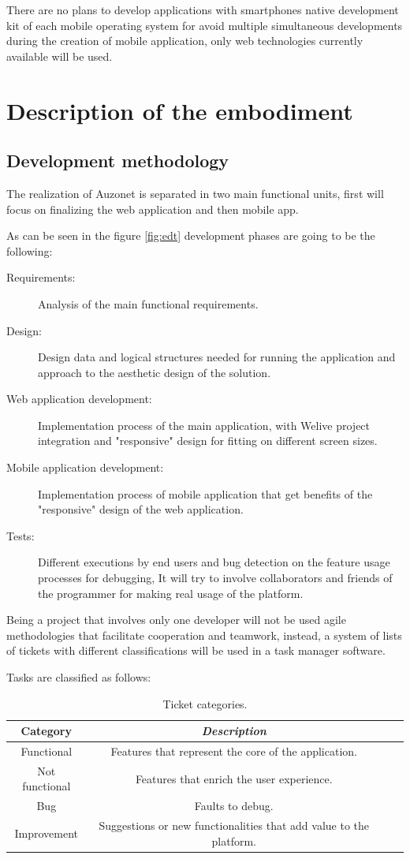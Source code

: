 \documentclass{DeustoFDP}
\begin{document}
There are no plans to develop applications with smartphones native development kit of each mobile operating system for avoid multiple simultaneous developments during the creation of  mobile application, only web technologies currently available will be used.

\section{Description of the embodiment}
\subsection{Development methodology}
The realization of Auzonet is separated in two main functional units, first will focus on finalizing the web application and then mobile app.

As can be seen in the figure \ref{fig:edt} development phases are going to be the following:
\begin{description}
	\item[Requirements:] Analysis of the main functional requirements.
	\item[Design:] Design data and logical structures needed for running the application and approach to the aesthetic design of the solution.
	\item[Web application development:] Implementation process of the main application, with Welive project integration and "responsive" design for fitting on different screen sizes.
	\item[Mobile application development:] Implementation process of mobile application that get benefits of the "responsive" design of the web application.
	\item[Tests:] Different executions by end users and bug detection on the feature usage processes for debugging, It will try to involve collaborators and friends of the programmer for making real usage of the platform.
\end{description}

Being a project that involves only one developer will not be used agile methodologies that facilitate cooperation and teamwork, instead, a system of lists of tickets with different classifications will be used in a task manager software.

Tasks are classified as follows:
\begin{table}[H]
	\centering
	\caption{Ticket categories.}\label{tab:ticketcategories}
	\begin{tabular}{cccc}
		\toprule
		\textbf{Category} & \emph{Description}\\
		\midrule
		Functional  & Features that represent the core of the application.\\
		Not functional   & Features that enrich the user experience.\\
		Bug & Faults to debug.\\
		Improvement & Suggestions or new functionalities that add value to the platform.\\
		\bottomrule
	\end{tabular}
\end{table}
\end{document}
